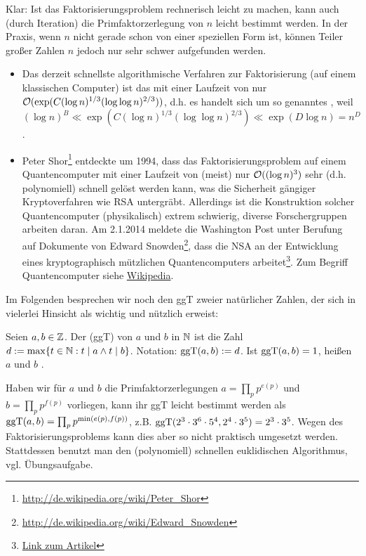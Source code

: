 Klar: Ist das Faktorisierungsproblem rechnerisch leicht zu machen, kann auch (durch Iteration) die Primfaktorzerlegung von $n$ leicht bestimmt werden. In der Praxis, wenn $n$ nicht gerade schon von einer speziellen Form ist, können Teiler großer Zahlen $n$ jedoch nur sehr schwer aufgefunden werden.
\begin{itemize}
	\item Das derzeit schnellste algorithmische Verfahren zur Faktorisierung (auf einem klassischen Computer) ist das  mit einer Laufzeit von nur $\mathcal{O}(\exp(C (\log n)^{1/3} (\log \log n)^{2/3}))$, d.h. es handelt sich um so genanntes , weil $(\log n)^B \ll \exp(C(\log n)^{1/3} (\log \log n)^{2/3}) \ll \exp(D \log n) = n^D$.
	\item Peter Shor\footnote{\url{http://de.wikipedia.org/wiki/Peter_Shor}} entdeckte um 1994, dass das Faktorisierungsproblem auf einem Quantencomputer mit einer Laufzeit von (meist) nur $\mathcal{O}((\log n)^3)$ sehr (d.h. polynomiell) schnell gelöst werden kann, was die Sicherheit gängiger Kryptoverfahren wie RSA untergräbt. Allerdings ist die Konstruktion solcher Quantencomputer (physikalisch) extrem schwierig, diverse Forschergruppen arbeiten daran. Am 2.1.2014 meldete die Washington Post unter Berufung auf Dokumente von Edward Snowden\footnote{\url{http://de.wikipedia.org/wiki/Edward_Snowden}}, dass die NSA an der Entwicklung eines kryptographisch mützlichen Quantencomputers arbeitet\footnote{\href{http://www.washingtonpost.com/world/national-security/nsa-seeks-to-build-quantum-computer-that-could-crack-most-types-of-encryption/2014/01/02/8fff297e-7195-11e3-8def-a33011492df2_story.html}{Link zum Artikel}}.
	Zum Begriff Quantencomputer siehe \href{http://de.wikipedia.org/wiki/Quantencomputer}{Wikipedia}.
\end{itemize} 

Im Folgenden besprechen wir noch den ggT zweier natürlicher Zahlen, der sich in vielerlei Hinsicht als wichtig und nützlich erweist:
\begin{defn}
	Seien $a,b \in \mathbb{Z}$. Der  (ggT) von $a$ und $b$ in $\mathbb{N}$ ist die Zahl $d := \max\{t \in \mathbb{N} : t \mid a \wedge t \mid b\}$. Notation: $\operatorname{ggT}(a,b) := d$. Ist $\operatorname{ggT}(a,b) = 1$, heißen $a$ und $b$ . 
\end{defn}
Haben wir für $a$ und $b$ die Primfaktorzerlegungen $a = \prod_p p^{e(p)}$ und $b = \prod_p p^{f(p)}$ vorliegen, kann ihr ggT leicht bestimmt werden als $\operatorname{ggT}(a,b) = \prod_p p^{\min(e(p),f(p))}$, z.B. $\operatorname{ggT}(2^3 \cdot 3^6 \cdot 5^4, 2^4 \cdot 3^5) = 2^3 \cdot 3^5$. Wegen des Faktorisierungsproblems kann dies aber so nicht praktisch umgesetzt werden. Stattdessen benutzt man den (polynomiell) schnellen euklidischen Algorithmus, vgl. Übungsaufgabe.

